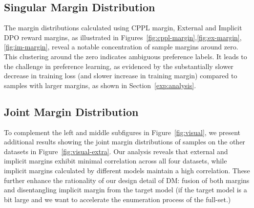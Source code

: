\subsection{Singular Margin Distribution} 
\label{app:singular}
The margin distributions calculated using CPPL margin, External and Implicit DPO reward margins, as illustrated in Figures~\ref{fig:cppl-margin},\ref{fig:ex-margin},\ref{fig:im-margin}, reveal a notable concentration of sample margins around zero. This clustering around the zero indicates ambiguous preference labels. It leads to the challenge in preference learning, as evidenced by the substantially slower decrease in training loss (and slower increase in training margin) compared to samples with larger margins, as shown in Section~\ref{exp:analysis}.


\subsection{Joint Margin Distribution} 
\label{app:joint}
To complement the left and middle subfigures in Figure~\ref{fig:visual}, we present additional results showing the joint margin distributions of samples on the other datasets in Figure~\ref{fig:visual-extra}. Our analysis reveals that external and implicit margins exhibit minimal correlation across all four datasets, while implicit margins calculated by different models maintain a high correlation. These further enhance the rationality of our design detail of DM: fusion of both margins and disentangling implicit margin from the target model (if the target model is a bit large and we want to accelerate the enumeration process of the full-set.)

